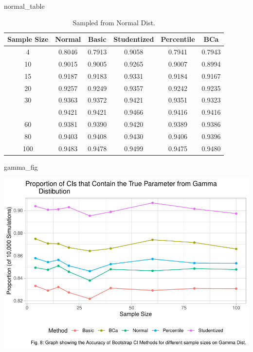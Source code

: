 \documentclass[12pt]{article}
\newenvironment{Shaded}{\begin{snugshade}}{\end{snugshade}}
\newcommand{\NormalTok}[1]{#1}
\begin{document}
\begin{Shaded}
\begin{Highlighting}[]
\NormalTok{normal\_table}
\end{Highlighting}
\end{Shaded}

\begin{table}

\caption{\label{tab:create graphs}Sampled from Normal Dist.}
\centering
\begin{tabular}[t]{cccccc}
\toprule
Sample Size & Normal & Basic & Studentized & Percentile & BCa\\
\midrule
4 & 0.8046 & 0.7913 & 0.9058 & 0.7941 & 0.7943\\
10 & 0.9015 & 0.9005 & 0.9265 & 0.9007 & 0.8994\\
15 & 0.9187 & 0.9183 & 0.9331 & 0.9184 & 0.9167\\
20 & 0.9257 & 0.9249 & 0.9357 & 0.9242 & 0.9235\\
30 & 0.9363 & 0.9372 & 0.9421 & 0.9351 & 0.9323\\
\addlinespace
40 & 0.9421 & 0.9421 & 0.9466 & 0.9416 & 0.9416\\
60 & 0.9381 & 0.9390 & 0.9420 & 0.9389 & 0.9386\\
80 & 0.9403 & 0.9408 & 0.9430 & 0.9406 & 0.9396\\
100 & 0.9483 & 0.9478 & 0.9499 & 0.9475 & 0.9480\\
\bottomrule
\end{tabular}
\end{table}

\begin{Shaded}
\begin{Highlighting}[]
\NormalTok{gamma\_fig}
\end{Highlighting}
\end{Shaded}

\includegraphics{paper_files/figure-latex/unnamed-chunk-24-3.pdf}
\end{document}
